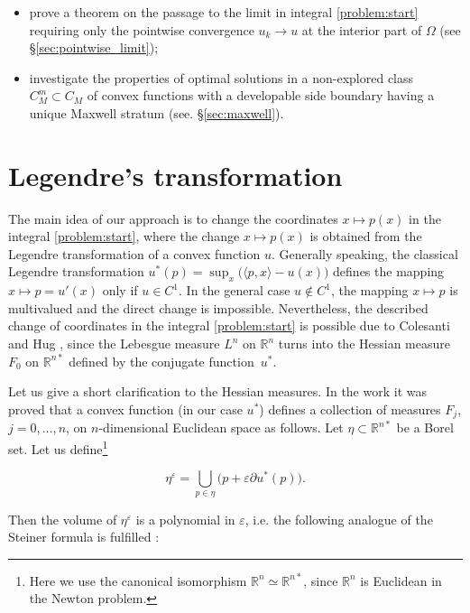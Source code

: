\documentclass[14pt]{extarticle}
\newcommand{\R}{\mathbb{R}}
\theoremstyle{remark}
\theoremstyle{definition}
\begin{document}
\begin{itemize}
	\item prove a theorem on the passage to the limit in integral \eqref{problem:start} requiring only the pointwise convergence $u_k\to u$ at the interior part of $\Omega$ (see \S \ref{sec:pointwise_limit});	
	\item investigate the properties of optimal solutions in a non-explored class $C_M^m\subset C_M$ of convex functions with a developable side boundary having a unique Maxwell stratum (see. 
	\S \ref{sec:maxwell}).
\end{itemize}
	




\section{Legendre's transformation}
\label{sec:Legandre_transform}

The main idea of our approach is to change the coordinates $x\mapsto p(x)$ in the integral \eqref{problem:start}, where the change $x\mapsto p(x)$ is obtained from the Legendre transformation of a convex function $u$. Generally speaking, the classical Legendre transformation $u^*(p)=\sup_{x}\big(\langle p,x\rangle - u(x)\big)$ defines the mapping $x\mapsto p=u'(x)$ only if $u\in C^1$. In the general case $u\not\in C^1$, the mapping $x\mapsto p$ is multivalued and the direct change is impossible. Nevertheless, the described change of coordinates in the integral \eqref{problem:start} is possible due to Colesanti and Hug \cite{ColesantiFirst,ColesantiHug}, since the Lebesgue measure $L^n$ on $\R^n$ turns into the Hessian measure $F_0$ on $\R^{n*}$ defined by the conjugate function~$u^*$.

Let us give a short clarification to the Hessian measures. In the work \cite{ColesantiFirst} it was proved that a convex function (in our case $u^*$) defines a collection of measures $F_j$, $j=0,\ldots,n$, on $n$-dimensional Euclidean space as follows. Let $\eta\subset \R^{n*}$ be a Borel set.
Let us define\footnote{Here we use the canonical isomorphism $\R^n\simeq\R^{n*}$, since $\R^n$ is Euclidean in the Newton problem.}

\[
	\eta^\varepsilon = \bigcup_{p\in\eta} \big(p+\varepsilon\partial u^*(p)\big).
\]

\noindent Then the volume of $\eta^\varepsilon$ is a polynomial in $\varepsilon$, i.e. the following analogue of the Steiner formula is fulfilled \cite{Schneider}:
\end{document}
